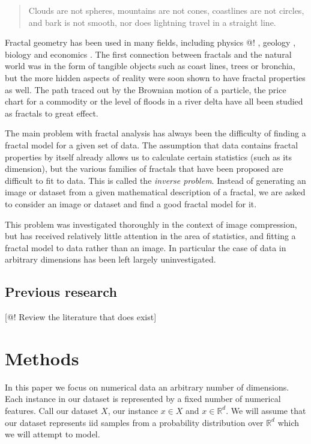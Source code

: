 \documentclass[11pt]{article}
\theoremstyle{definition}
\begin{document}
\begin{quotation}
\small
\noindent Clouds are not spheres, mountains are not cones, coastlines are not circles, and bark is not smooth, nor does lightning travel in a straight line.
\end{quotation}

Fractal geometry has been used in many fields, including physics @! \cite{}, geology \cite{cheng1997multifractal}, biology \cite{goldberger1992fractal} and economics \cite{turiel2003multifractal}. The first connection between fractals and the natural world was in the form of tangible objects such as coast lines, trees or bronchia, but the more hidden aspects of reality were soon shown to have fractal properties as well. The path traced out by the Brownian motion of a particle, the price chart for a commodity or the level of floods in a river delta have all been studied as fractals to great effect.

The main problem with fractal analysis has always been the difficulty of finding a fractal model for a given set of data. The assumption that data contains fractal properties by itself already allows us to calculate certain statistics (such as its dimension), but the various families of fractals that have been proposed are difficult to fit to data. This is called the \emph{inverse problem}. Instead of generating an image or dataset from a given mathematical description of a fractal, we are asked to consider an image or dataset and find a good fractal model for it.

This problem was investigated thoroughly in the context of image compression, but has received relatively little attention in the area of statistics, and fitting a fractal model to data rather than an image. In particular the case of data in arbitrary dimensions has been left largely uninvestigated.

\subsection{Previous research}
[@! Review the literature that does exist]

\section{Methods}

In this paper we focus on numerical data an arbitrary number of dimensions. Each instance in our dataset is represented by a fixed number of numerical features. Call our dataset $X$, our instance $x \in X$ and $x \in {\mathbb R}^d$. We will assume that our dataset represents iid samples from a probability distribution over ${\mathbb R}^d$ which we will attempt to model.
\end{document}
